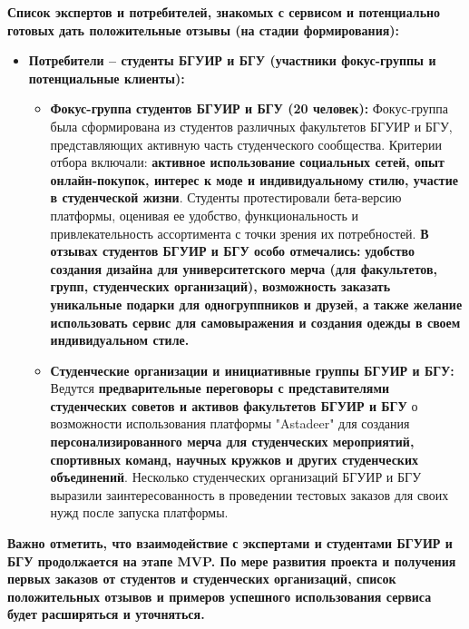 \vspace{0.3cm}

\textbf{Список экспертов и потребителей, знакомых с сервисом и потенциально готовых дать положительные отзывы (на стадии формирования):}

\begin{itemize}
    \item \textbf{Потребители – студенты БГУИР и БГУ (участники фокус-группы и потенциальные клиенты):}
        \begin{itemize}
            \item \textbf{Фокус-группа студентов БГУИР и БГУ (20 человек):}  Фокус-группа была сформирована из студентов различных факультетов БГУИР и БГУ, представляющих активную часть студенческого сообщества.  Критерии отбора включали: \textbf{активное использование социальных сетей, опыт онлайн-покупок, интерес к моде и индивидуальному стилю, участие в студенческой жизни}.  Студенты протестировали бета-версию платформы, оценивая ее удобство, функциональность и привлекательность ассортимента с точки зрения их потребностей. \textbf{В отзывах студентов БГУИР и БГУ особо отмечались:}  \textbf{удобство создания дизайна для университетского мерча (для факультетов, групп, студенческих организаций), возможность заказать уникальные подарки для одногруппников и друзей, а также желание использовать сервис для самовыражения и создания одежды в своем индивидуальном стиле.}
            \item \textbf{Студенческие организации и инициативные группы БГУИР и БГУ:}  Ведутся \textbf{предварительные переговоры с представителями студенческих советов и активов факультетов БГУИР и БГУ}  о возможности использования платформы "Astadeer" для создания \textbf{персонализированного мерча для студенческих мероприятий, спортивных команд, научных кружков и других студенческих объединений}.  Несколько студенческих организаций БГУИР и БГУ выразили заинтересованность в проведении тестовых заказов для своих нужд после запуска платформы.
        \end{itemize}
\end{itemize}

\vspace{0.3cm}

\textbf{Важно отметить, что взаимодействие с экспертами и студентами БГУИР и БГУ продолжается на этапе MVP.  По мере развития проекта и получения первых заказов от студентов и студенческих организаций, список положительных отзывов и примеров успешного использования сервиса будет расширяться и уточняться.}